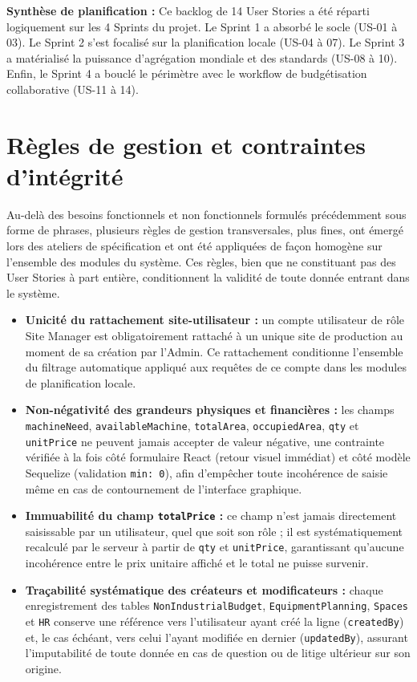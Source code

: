 \textbf{Synthèse de planification :} Ce backlog de 14 User Stories a été réparti logiquement sur les 4 Sprints du projet. Le Sprint 1 a absorbé le socle (US-01 à 03). Le Sprint 2 s'est focalisé sur la planification locale (US-04 à 07). Le Sprint 3 a matérialisé la puissance d'agrégation mondiale et des standards (US-08 à 10). Enfin, le Sprint 4 a bouclé le périmètre avec le workflow de budgétisation collaborative (US-11 à 14).

\section{Règles de gestion et contraintes d'intégrité}
Au-delà des besoins fonctionnels et non fonctionnels formulés précédemment sous forme de phrases, plusieurs règles de gestion transversales, plus fines, ont émergé lors des ateliers de spécification et ont été appliquées de façon homogène sur l'ensemble des modules du système. Ces règles, bien que ne constituant pas des User Stories à part entière, conditionnent la validité de toute donnée entrant dans le système.

\begin{itemize}
    \item \textbf{Unicité du rattachement site-utilisateur :} un compte utilisateur de rôle Site Manager est obligatoirement rattaché à un unique site de production au moment de sa création par l'Admin. Ce rattachement conditionne l'ensemble du filtrage automatique appliqué aux requêtes de ce compte dans les modules de planification locale.
    \item \textbf{Non-négativité des grandeurs physiques et financières :} les champs \texttt{machineNeed}, \texttt{availableMachine}, \texttt{totalArea}, \texttt{occupiedArea}, \texttt{qty} et \texttt{unitPrice} ne peuvent jamais accepter de valeur négative, une contrainte vérifiée à la fois côté formulaire React (retour visuel immédiat) et côté modèle Sequelize (validation \texttt{min: 0}), afin d'empêcher toute incohérence de saisie même en cas de contournement de l'interface graphique.
    \item \textbf{Immuabilité du champ \texttt{totalPrice} :} ce champ n'est jamais directement saisissable par un utilisateur, quel que soit son rôle ; il est systématiquement recalculé par le serveur à partir de \texttt{qty} et \texttt{unitPrice}, garantissant qu'aucune incohérence entre le prix unitaire affiché et le total ne puisse survenir.
    \item \textbf{Traçabilité systématique des créateurs et modificateurs :} chaque enregistrement des tables \texttt{NonIndustrialBudget}, \texttt{EquipmentPlanning}, \texttt{Spaces} et \texttt{HR} conserve une référence vers l'utilisateur ayant créé la ligne (\texttt{createdBy}) et, le cas échéant, vers celui l'ayant modifiée en dernier (\texttt{updatedBy}), assurant l'imputabilité de toute donnée en cas de question ou de litige ultérieur sur son origine.
\end{itemize}

